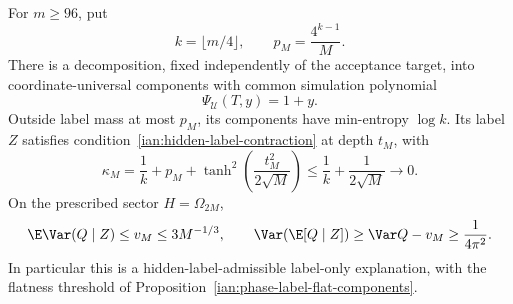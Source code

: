 \begin{proposition}\label{ian:forrelation-explaining-decomposition}
For \(m\ge96\), put
\[
 k=\lfloor m/4\rfloor,\qquad p_M=\frac{4^{k-1}}M.
\]
There is a decomposition, fixed independently of the acceptance target, into coordinate-universal components with common simulation polynomial
\[
 \Psi_{\mathcal U}(T,y)=1+y.
\]
Outside label mass at most \(p_M\), its components have min-entropy \(\log k\). Its label \(Z\) satisfies condition~\eqref{ian:hidden-label-contraction} at depth \(t_M\), with
\[
 \kappa_M=
 \frac1k+p_M+\tanh^2\!\left(\frac{t_M^2}{2\sqrt M}\right)
 \le\frac1k+\frac1{2\sqrt M}\longrightarrow0.
\]
On the prescribed sector \(H=\Omega_{2M}\),
\[
 \E\Var(Q\mid Z)\le v_M\le3M^{-1/3},
 \qquad
 \Var(\E[Q\mid Z])\ge\Var Q-v_M\ge\frac1{4\pi^2}.
\]
In particular this is a hidden-label-admissible label-only explanation, with the flatness threshold of Proposition~\ref{ian:phase-label-flat-components}.
\end{proposition}
